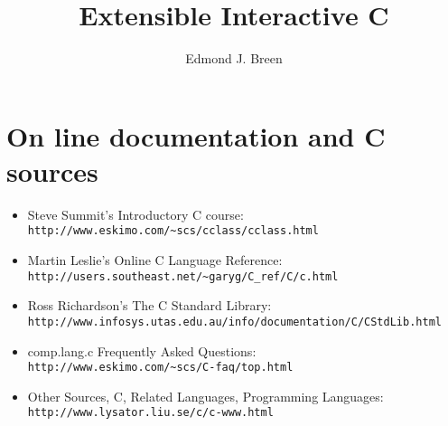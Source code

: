 \documentclass[12pt]{book}
\title{Extensible Interactive C }
\author{Edmond J. Breen}
\begin{document}
\maketitle

\frontmatter

\tableofcontents
%
%

\mainmatter

%
%

%

\appendix





 

\section*{On line documentation and C sources}
\begin{itemize}
\item  Steve Summit's Introductory C course: \\
\verb+http://www.eskimo.com/~scs/cclass/cclass.html+
\item  Martin Leslie's Online C Language Reference:\\
 \verb+http://users.southeast.net/~garyg/C_ref/C/c.html+
\item Ross Richardson's The C Standard Library:\\
\verb+http://www.infosys.utas.edu.au/info/documentation/C/CStdLib.html+
\item comp.lang.c Frequently Asked Questions:\\
\verb+http://www.eskimo.com/~scs/C-faq/top.html+
\item Other Sources, C,   Related Languages, Programming Languages:\\ 
\verb+http://www.lysator.liu.se/c/c-www.html+
\end{itemize}

\printindex
\end{document}
